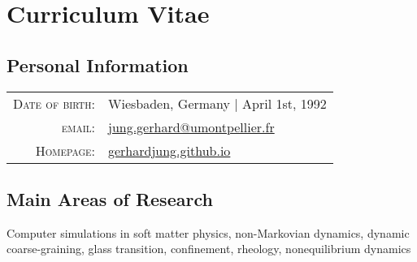 
\section*{Curriculum Vitae}
\label{sec:cv}


\subsection*{Personal Information}

\begin{tabular}{rl}
	\textsc{Date of birth:} & Wiesbaden, Germany  | April 1st, 1992 \\
	\textsc{email:}     & \href{jung.gerhard@umontpellier.fr}{\small \url{jung.gerhard@umontpellier.fr}}  \\
	 
	\textsc{Homepage:}     & \href{gerhardjung.github.io}{\small \url{gerhardjung.github.io}}\\
	
\end{tabular}

\subsection*{Main Areas of Research}
Computer simulations in soft matter physics, non-Markovian dynamics, dynamic coarse-graining, glass
transition, confinement, rheology, nonequilibrium dynamics

